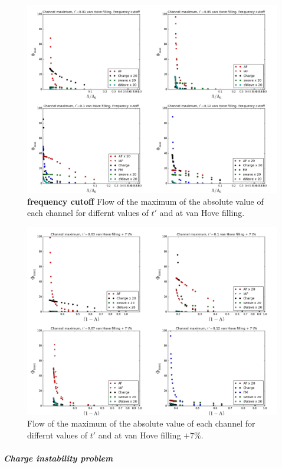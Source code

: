 \begin{figure}
\includegraphics[scale=0.25]{images/freqvanhove.png}
\caption{\textbf{frequency cutoff} Flow of the maximum of the absolute value of each channel for differnt values of $t'$ and at van Hove filling. } 
\label{freqlam} 
\end{figure}

\begin{figure}
\includegraphics[scale=0.25]{images/vanhovepluslambda.png}
\caption{Flow of the maximum of the absolute value of each channel for differnt values of $t'$ and at van Hove filling $+7 \%$.
} 
\label{lamvanplus} 
\end{figure}

\subparagraph{Charge instability problem}

